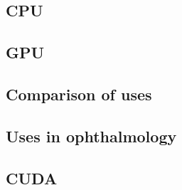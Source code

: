 \subsection{CPU}


\subsection{GPU}


\subsection{Comparison of uses}


\subsection{Uses in ophthalmology}


\subsection{CUDA}

